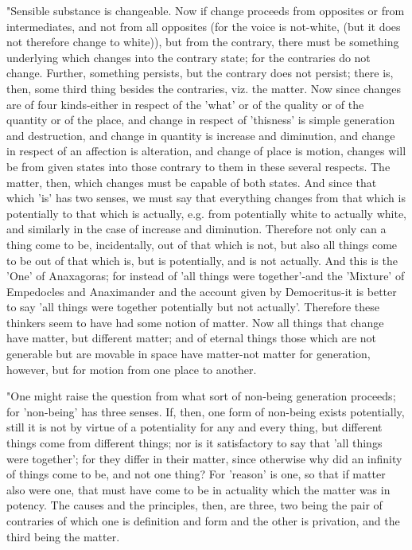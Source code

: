 "Sensible substance is changeable. Now if change proceeds from opposites
or from intermediates, and not from all opposites (for the voice is
not-white, (but it does not therefore change to white)), but from
the contrary, there must be something underlying which changes into
the contrary state; for the contraries do not change. Further, something
persists, but the contrary does not persist; there is, then, some
third thing besides the contraries, viz. the matter. Now since changes
are of four kinds-either in respect of the 'what' or of the quality
or of the quantity or of the place, and change in respect of 'thisness'
is simple generation and destruction, and change in quantity is increase
and diminution, and change in respect of an affection is alteration,
and change of place is motion, changes will be from given states into
those contrary to them in these several respects. The matter, then,
which changes must be capable of both states. And since that which
'is' has two senses, we must say that everything changes from that
which is potentially to that which is actually, e.g. from potentially
white to actually white, and similarly in the case of increase and
diminution. Therefore not only can a thing come to be, incidentally,
out of that which is not, but also all things come to be out of that
which is, but is potentially, and is not actually. And this is the
'One' of Anaxagoras; for instead of 'all things were together'-and
the 'Mixture' of Empedocles and Anaximander and the account given
by Democritus-it is better to say 'all things were together potentially
but not actually'. Therefore these thinkers seem to have had some
notion of matter. Now all things that change have matter, but different
matter; and of eternal things those which are not generable but are
movable in space have matter-not matter for generation, however, but
for motion from one place to another. 

"One might raise the question from what sort of non-being generation
proceeds; for 'non-being' has three senses. If, then, one form of
non-being exists potentially, still it is not by virtue of a potentiality
for any and every thing, but different things come from different
things; nor is it satisfactory to say that 'all things were together';
for they differ in their matter, since otherwise why did an infinity
of things come to be, and not one thing? For 'reason' is one, so that
if matter also were one, that must have come to be in actuality which
the matter was in potency. The causes and the principles, then, are
three, two being the pair of contraries of which one is definition
and form and the other is privation, and the third being the matter.

